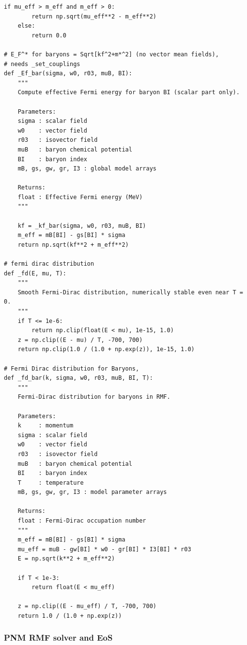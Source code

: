 \documentclass[12pt]{article}
\begin{document}
\begin{lstlisting}[style=mypython]
    if mu_eff > m_eff and m_eff > 0:
        return np.sqrt(mu_eff**2 - m_eff**2)
    else:
        return 0.0

# E_F^* for baryons = Sqrt[kf^2+m*^2] (no vector mean fields), 
# needs _set_couplings
def _Ef_bar(sigma, w0, r03, muB, BI):
    """
    Compute effective Fermi energy for baryon BI (scalar part only).

    Parameters:
    sigma : scalar field
    w0    : vector field
    r03   : isovector field
    muB   : baryon chemical potential
    BI    : baryon index
    mB, gs, gw, gr, I3 : global model arrays

    Returns:
    float : Effective Fermi energy (MeV)
    """

    kf = _kf_bar(sigma, w0, r03, muB, BI)
    m_eff = mB[BI] - gs[BI] * sigma
    return np.sqrt(kf**2 + m_eff**2)

# fermi dirac distribution
def _fd(E, mu, T):
    """
    Smooth Fermi-Dirac distribution, numerically stable even near T = 0.
    """
    if T <= 1e-6:
        return np.clip(float(E < mu), 1e-15, 1.0)
    z = np.clip((E - mu) / T, -700, 700)
    return np.clip(1.0 / (1.0 + np.exp(z)), 1e-15, 1.0)

# Fermi Dirac distribution for Baryons, 
def _fd_bar(k, sigma, w0, r03, muB, BI, T):
    """
    Fermi-Dirac distribution for baryons in RMF.

    Parameters:
    k     : momentum
    sigma : scalar field
    w0    : vector field
    r03   : isovector field
    muB   : baryon chemical potential
    BI    : baryon index
    T     : temperature
    mB, gs, gw, gr, I3 : model parameter arrays

    Returns:
    float : Fermi-Dirac occupation number
    """
    m_eff = mB[BI] - gs[BI] * sigma
    mu_eff = muB - gw[BI] * w0 - gr[BI] * I3[BI] * r03
    E = np.sqrt(k**2 + m_eff**2)

    if T < 1e-3:
        return float(E < mu_eff)

    z = np.clip((E - mu_eff) / T, -700, 700)
    return 1.0 / (1.0 + np.exp(z))
\end{lstlisting}


\subsubsection{PNM RMF solver and EoS}
\end{document}
